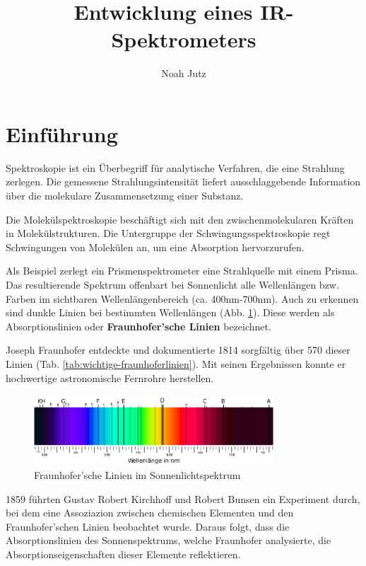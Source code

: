 \documentclass{article}
\title{Entwicklung eines IR-Spektrometers}
\author{Noah Jutz}
\date{}
\begin{document}
\maketitle
\tableofcontents

\newpage
\section{Einführung}
Spektroskopie ist ein Überbegriff für analytische Verfahren, die eine Strahlung zerlegen. Die gemessene Strahlungsintensität liefert ausschlaggebende Information über die molekulare Zusammensetzung einer Substanz.

Die Molekülspektroskopie beschäftigt sich mit den zwischenmolekularen Kräften in Molekülstrukturen. Die Untergruppe der Schwingungsspektroskopie regt Schwingungen von Molekülen an, um eine Absorption hervorzurufen.


Als Beispiel zerlegt ein Prismenspektrometer eine Strahlquelle mit einem Prisma. Das resultierende Spektrum offenbart bei Sonnenlicht alle Wellenlängen bzw. Farben im sichtbaren Wellenlängenbereich (ca. 400nm-700nm). Auch zu erkennen sind dunkle Linien bei bestimmten Wellenlängen (Abb. \ref{fig:fraunhofer-linien}). Diese werden als Absorptionslinien oder \textbf{Fraunhofer'sche Linien} bezeichnet.

Joseph Fraunhofer entdeckte und dokumentierte 1814 sorgfältig über 570 dieser Linien (Tab. \ref{tab:wichtige-fraunhoferlinien}). Mit seinen Ergebnissen konnte er hochwertige astronomische Fernrohre herstellen.

\begin{figure}[ht]
    \centering
    \includegraphics[width=0.8\textwidth]{fraunhofer_linien.png}
    \caption{Fraunhofer'sche Linien im Sonnenlichtspektrum}
    \label{fig:fraunhofer-linien}
\end{figure}

1859 führten Gustav Robert Kirchhoff und Robert Bunsen ein Experiment durch, bei dem eine Assoziazion zwischen chemischen Elementen und den Fraunhofer'schen Linien beobachtet wurde. Daraus folgt, dass die Absorptionslinien des Sonnenspektrums, welche Fraunhofer analysierte, die Absorptionseigenschaften dieser Elemente reflektieren.
\end{document}
